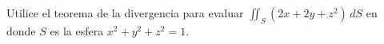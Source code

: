 \item Utilice el teorema de la divergencia para evaluar $\iint_S (2x + 2y + z^2) \, dS$ en donde $S$ es la esfera $x^2 + y^2 + z^2 = 1$.
